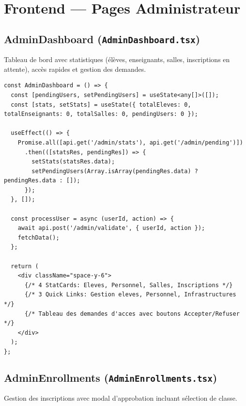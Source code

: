 \documentclass[12pt,a4paper]{article}
\begin{document}
\newpage

\section{Frontend --- Pages Administrateur}

\subsection{AdminDashboard (\texttt{AdminDashboard.tsx})}

Tableau de bord avec statistiques (élèves, enseignants, salles, inscriptions en attente), accès rapides et gestion des demandes.

\begin{lstlisting}[style=code]
const AdminDashboard = () => {
  const [pendingUsers, setPendingUsers] = useState<any[]>([]);
  const [stats, setStats] = useState({ totalEleves: 0, totalEnseignants: 0, totalSalles: 0, pendingUsers: 0 });

  useEffect(() => {
    Promise.all([api.get('/admin/stats'), api.get('/admin/pending')])
      .then(([statsRes, pendingRes]) => {
        setStats(statsRes.data);
        setPendingUsers(Array.isArray(pendingRes.data) ? pendingRes.data : []);
      });
  }, []);

  const processUser = async (userId, action) => {
    await api.post('/admin/validate', { userId, action });
    fetchData();
  };

  return (
    <div className="space-y-6">
      {/* 4 StatCards: Eleves, Personnel, Salles, Inscriptions */}
      {/* 3 Quick Links: Gestion eleves, Personnel, Infrastructures */}
      {/* Tableau des demandes d'acces avec boutons Accepter/Refuser */}
    </div>
  );
};
\end{lstlisting}

\subsection{AdminEnrollments (\texttt{AdminEnrollments.tsx})}

Gestion des inscriptions avec modal d'approbation incluant sélection de classe.
\end{document}
